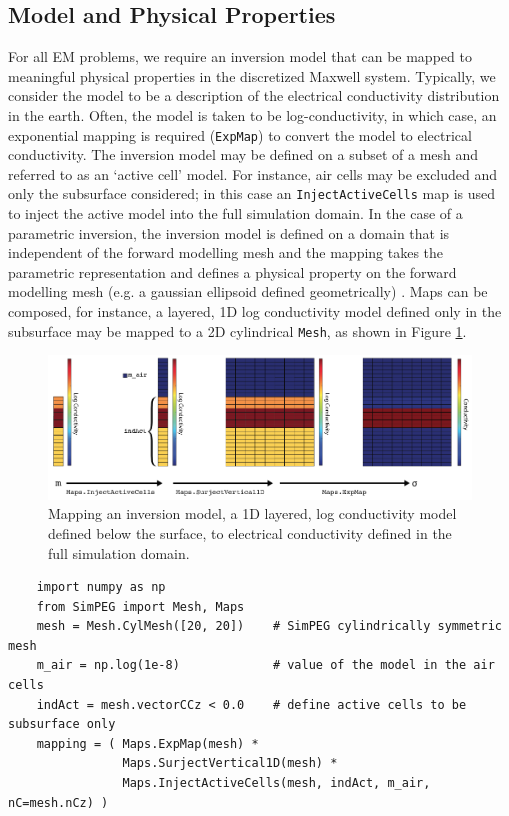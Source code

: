 \documentclass[preprint,review,3p,times,onecolumn,authoryear]{elsarticle}
\newcommand{\ExpMap}{\texttt{ExpMap}\xspace}
\newcommand{\InjectActiveCells}{\texttt{InjectActiveCells}\xspace}
\begin{document}

\subsection{Model and Physical Properties}
\label{sec:ModelPhysProps}

For all EM problems, we require an inversion model
that can be mapped to meaningful physical properties in the discretized
Maxwell system. Typically, we consider the model to be a description of the
electrical conductivity distribution in the earth. Often, the model is taken
to be log-conductivity, in which case, an exponential mapping is required
(\ExpMap) to convert the model to electrical conductivity. The inversion model
may be defined on a subset of a mesh and referred to as an  `active cell' model.
For instance, air cells may be excluded and only the subsurface considered; in
this case an \InjectActiveCells map is used to inject the active model into
the full simulation domain. In the case of a parametric inversion, the
inversion model is defined on a domain that is independent of the forward
modelling mesh and the mapping takes the parametric representation and defines
a physical property on the forward modelling mesh  (e.g. a gaussian ellipsoid
defined geometrically) \citep{MaokunLi2010, Pidlisecky2011, McMillan2015,
Kang2015}. Maps can be composed, for instance, a layered, 1D log conductivity
model defined only in the subsurface may be mapped to a 2D cylindrical
\texttt{Mesh}, as shown in Figure \ref{fig:mapping}.
{%
\begin{figure}[htb!]
    \centering
    \includegraphics[width=\textwidth]{images/mapping}
    \caption{Mapping an inversion model, a 1D layered, log conductivity model defined below the surface, to electrical conductivity defined in the full simulation domain.}
\label{fig:mapping}
\end{figure}
}\noindent
{\scriptsize
\begin{verbatim}
    import numpy as np
    from SimPEG import Mesh, Maps
    mesh = Mesh.CylMesh([20, 20])    # SimPEG cylindrically symmetric mesh
    m_air = np.log(1e-8)             # value of the model in the air cells
    indAct = mesh.vectorCCz < 0.0    # define active cells to be subsurface only
    mapping = ( Maps.ExpMap(mesh) *
                Maps.SurjectVertical1D(mesh) *
                Maps.InjectActiveCells(mesh, indAct, m_air, nC=mesh.nCz) )
\end{verbatim}
}\noindent
\end{document}
